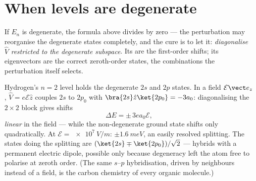 \section{When levels are degenerate}

\begin{theorem}\label{thm:b3:perturbation-theory:degenerate}
If $E_n$ is degenerate, the formula above divides by zero --- the
perturbation may reorganise the degenerate states completely, and
the cure is to let it: \emph{diagonalise $\hat V$ restricted to the
degenerate subspace}. Its  are the first-order shifts;
its eigenvectors are the correct zeroth-order states, the
combinations the perturbation itself selects.
\end{theorem}
\admitted

\begin{example}\label{ex:b3:perturbation-theory:stark}
Hydrogen's $n = 2$ level holds the degenerate $2s$ and $2p$ states.
In a field $\mathcal E\vect e_z$, $\hat V = e\mathcal E\hat z$
couples $2s$ to $2p_0$ with $\bra{2s}\hat z\ket{2p_0} = -3a_0$:
diagonalising the $2\times2$ block gives shifts
\[
\Delta E = \pm\,3e a_0\mathcal E ,
\]
\emph{linear} in the field --- while the non-degenerate ground state
shifts only quadratically. At $\mathcal E = \qty{e7}{V/m}$: $\pm
\qty{1.6}{meV}$, an easily resolved splitting. The states doing the
splitting are $(\ket{2s} \mp \ket{2p_0})/\sqrt2$ --- hybrids with a
permanent electric dipole, possible only because degeneracy left
the atom free to polarise at zeroth order. (The same $s$--$p$
hybridisation, driven by neighbours instead of a field, is the
carbon chemistry of every organic molecule.)
\end{example}

